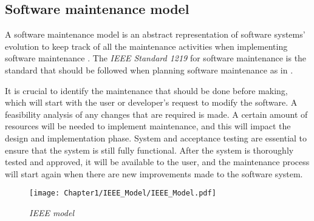 \subsection{Software maintenance model}
A software maintenance model is an abstract representation of software systems' evolution to keep track of all the maintenance activities when implementing software maintenance \cite{Ren2011}. The \textit{IEEE Standard 1219} for software maintenance is the standard that should be followed when planning software maintenance as in .\par It is crucial to identify the maintenance that should be done before making, which will start with the user or developer's request to modify the software. A feasibility analysis of any changes that are required is made. A certain amount of resources will be needed to implement maintenance, and this will impact the design and implementation phase. System and acceptance testing are essential to ensure that the system is still fully functional. After the system is thoroughly tested and approved, it will be available to the user, and the maintenance process will start again when there are new improvements made to the software system.

\begin{figure}[!htb] %
	\centering %
	\texttt{[image: Chapter1/IEEE\_Model/IEEE\_Model.pdf]}
	\caption[IEEE model]
	{\textit{IEEE model \cite{Ren2011}}} \label{fig:CH1_IEEE_Model}
\end{figure}

